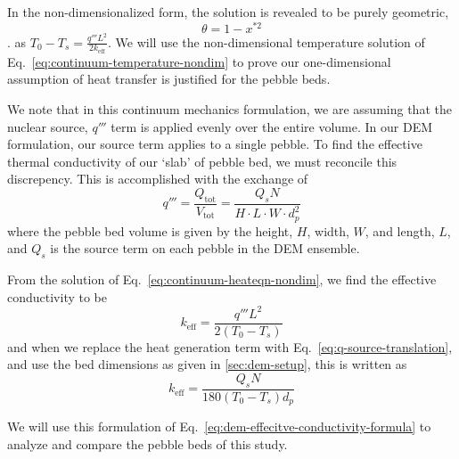 In the non-dimensionalized form, the solution is revealed to be purely geometric,
\begin{equation}\label{eq:continuum-temperature-nondim}
	\theta = 1-x^{*2}
\end{equation}. 
as $T_0  - T_s = \frac{q'''L^2}{2k_\text{eff}}$. We will use the non-dimensional temperature solution of Eq.~\ref{eq:continuum-temperature-nondim} to prove our one-dimensional assumption of heat transfer is justified for the pebble beds.

We note that in this continuum mechanics formulation, we are assuming that the nuclear source, $q'''$ term is applied evenly over the entire volume. In our DEM formulation, our source term applies to a single pebble. To find the effective thermal conductivity of our `slab' of pebble bed, we must reconcile this discrepency. This is accomplished with the exchange of
\begin{equation}\label{eq:q-source-translation}
	q''' = \frac{Q_\text{tot}}{V_\text{tot}} = \frac{Q_sN}{H\cdot L\cdot W\cdot d_p^2}
\end{equation}
where the pebble bed volume is given by the height, $H$, width, $W$, and length, $L$, and $Q_s$ is the source term on each pebble in the DEM ensemble. 

From the solution of Eq.~\ref{eq:continuum-heateqn-nondim}, we find the effective conductivity to be
\begin{equation}
	k_\text{eff} = \frac{q''' L^2}{2(T_0-T_s)}
\end{equation}
and when we replace the heat generation term with Eq.~\ref{eq:q-source-translation}, and use the bed dimensions as given in \cref{sec:dem-setup}, this is written as
\begin{equation}\label{eq:dem-effecitve-conductivity-formula}
	k_\text{eff} = \frac{Q_sN}{180(T_0-T_s)d_p}
\end{equation}

We will use this formulation of Eq.~\ref{eq:dem-effecitve-conductivity-formula} to analyze and compare the pebble beds of this study.




